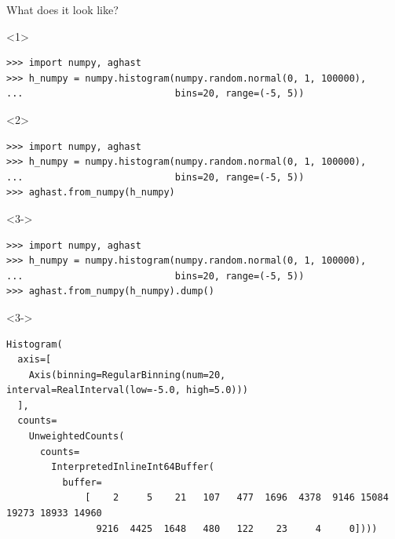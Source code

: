 \documentclass[aspectratio=169]{beamer}
\begin{document}
\begin{frame}[fragile]{What does it look like?}
\small
\begin{onlyenv}<1>
\begin{verbatim}
>>> import numpy, aghast
>>> h_numpy = numpy.histogram(numpy.random.normal(0, 1, 100000),
...                           bins=20, range=(-5, 5))

\end{verbatim}
\end{onlyenv}
\begin{onlyenv}<2>
\begin{verbatim}
>>> import numpy, aghast
>>> h_numpy = numpy.histogram(numpy.random.normal(0, 1, 100000),
...                           bins=20, range=(-5, 5))
>>> aghast.from_numpy(h_numpy)
\end{verbatim}
\end{onlyenv}
\begin{onlyenv}<3->
\begin{verbatim}
>>> import numpy, aghast
>>> h_numpy = numpy.histogram(numpy.random.normal(0, 1, 100000),
...                           bins=20, range=(-5, 5))
>>> aghast.from_numpy(h_numpy).dump()
\end{verbatim}
\end{onlyenv}

\scriptsize
\begin{uncoverenv}<3->
\begin{verbatim}
Histogram(
  axis=[
    Axis(binning=RegularBinning(num=20, interval=RealInterval(low=-5.0, high=5.0)))
  ],
  counts=
    UnweightedCounts(
      counts=
        InterpretedInlineInt64Buffer(
          buffer=
              [    2     5    21   107   477  1696  4378  9146 15084 19273 18933 14960
                9216  4425  1648   480   122    23     4     0])))
\end{verbatim}
\end{uncoverenv}

\vspace{0.25 cm}
\end{frame}
\end{document}
